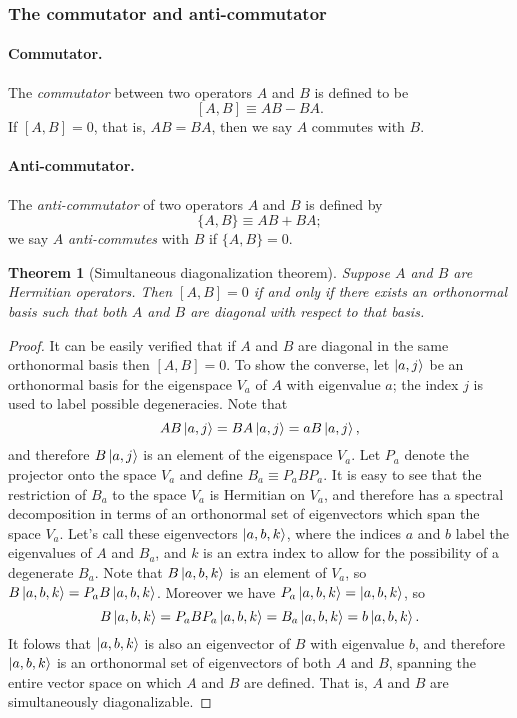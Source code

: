 \documentclass{article}
\newtheorem{theorem}{Theorem}
\numberwithin{theorem}{section}
\numberwithin{corollary}{section}
\begin{document}
\subsubsection{The commutator and anti-commutator}

\paragraph{Commutator.} The \emph{commutator} between two operators $A$ and $B$
is defined to be \[
  [A, B] \equiv AB - BA.
\] If $[A, B] = 0$, that is, $AB = BA$, then we say $A$ commutes with $B$.

\paragraph{Anti-commutator.} The \emph{anti-commutator} of two operators $A$
and $B$ is defined by \[
  \{A, B\} \equiv AB + BA;
\] we say $A$ \emph{anti-commutes} with $B$ if $\{A, B\} = 0$.

\begin{theorem}[Simultaneous diagonalization theorem]
  Suppose $A$ and $B$ are Hermitian operators. Then $[A, B] = 0$ if and only if
  there exists an orthonormal basis such that both $A$ and $B$ are diagonal
  with respect to that basis.
\end{theorem}

\begin{proof}
  It can be easily verified that if $A$ and $B$ are diagonal in the same
  orthonormal basis then $[A, B] = 0$. To show the converse, let $\ket{a, j}$
  be an orthonormal basis for the eigenspace $V_a$ of $A$ with eigenvalue $a$;
  the index $j$ is used to label possible degeneracies. Note that \[
    AB\ket{a, j} = BA\ket{a, j} = aB\ket{a, j},
  \] and therefore $B\ket{a, j}$ is an element of the eigenspace $V_a$. Let
  $P_a$ denote the projector onto the space $V_a$ and define $B_a \equiv
  P_aBP_a$. It is easy to see that the restriction of $B_a$ to the space $V_a$
  is Hermitian on $V_a$, and therefore has a spectral decomposition in terms of
  an orthonormal set of eigenvectors which span the space $V_a$. Let's call
  these eigenvectors $\ket{a, b, k}$, where the indices $a$ and $b$ label the
  eigenvalues of $A$ and $B_a$, and $k$ is an extra index to allow for the
  possibility of a degenerate $B_a$. Note that $B\ket{a, b, k}$ is an element
  of $V_a$, so $B\ket{a, b, k} = P_aB\ket{a, b, k}$. Moreover we have
  $P_a\ket{a, b, k} = \ket{a, b, k}$, so \[
    B\ket{a, b, k} = P_aBP_a\ket{a, b, k} = B_a\ket{a, b, k} = b\ket{a, b, k}.
  \] It folows that $\ket{a, b, k}$ is also an eigenvector of $B$ with
  eigenvalue $b$, and therefore $\ket{a, b, k}$ is an orthonormal set of
  eigenvectors of both $A$ and $B$, spanning the entire vector space on which
  $A$ and $B$ are defined. That is, $A$ and $B$ are simultaneously
  diagonalizable.
\end{proof}
\end{document}
